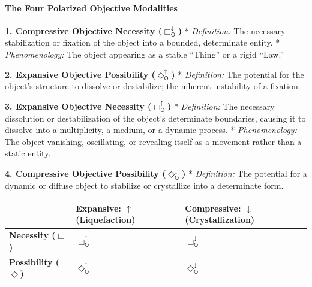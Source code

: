 \paragraph{The Four Polarized Objective Modalities}\label{the-four-polarized-objective-modalities}

\textbf{1. Compressive Objective Necessity (\(\Box_{\mathsf{O}}^{\downarrow}\))} * \emph{Definition:} The necessary stabilization or fixation of the object into a bounded, determinate entity. * \emph{Phenomenology:} The object appearing as a stable ``Thing'' or a rigid ``Law.''

\textbf{2. Expansive Objective Possibility (\(\Diamond_{\mathsf{O}}^{\uparrow}\))} * \emph{Definition:} The potential for the object's structure to dissolve or destabilize; the inherent instability of a fixation.

\textbf{3. Expansive Objective Necessity (\(\Box_{\mathsf{O}}^{\uparrow}\))} * \emph{Definition:} The necessary dissolution or destabilization of the object's determinate boundaries, causing it to dissolve into a multiplicity, a medium, or a dynamic process. * \emph{Phenomenology:} The object vanishing, oscillating, or revealing itself as a movement rather than a static entity.

\textbf{4. Compressive Objective Possibility (\(\Diamond_{\mathsf{O}}^{\downarrow}\))} * \emph{Definition:} The potential for a dynamic or diffuse object to stabilize or crystallize into a determinate form.

\begin{longtable}[]{@{}
  >{\raggedright\arraybackslash}p{}
  >{\centering\arraybackslash}p{}
  >{\centering\arraybackslash}p{}@{}}
\toprule\noalign{}
\begin{minipage}[b]{\linewidth}\raggedright
\end{minipage} & \begin{minipage}[b]{\linewidth}\centering
Expansive: \(\uparrow\) (Liquefaction)
\end{minipage} & \begin{minipage}[b]{\linewidth}\centering
Compressive: \(\downarrow\) (Crystallization)
\end{minipage} \\
\midrule\noalign{}
\endhead
\bottomrule\noalign{}
\endlastfoot
\textbf{Necessity (\(\Box\))} & \(\Box_{\mathsf{O}}^{\uparrow}\) & \(\Box_{\mathsf{O}}^{\downarrow}\) \\
\textbf{Possibility (\(\Diamond\))} & \(\Diamond_{\mathsf{O}}^{\uparrow}\) & \(\Diamond_{\mathsf{O}}^{\downarrow}\) \\
\end{longtable}


